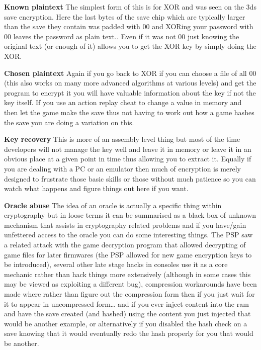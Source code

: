 \documentclass[
]{book}
\begin{document}
\textbf{Known plaintext} The simplest form of this is for XOR and was seen on the 3ds save encryption. Here the last bytes of the save chip which are typically larger than the save they contain was padded with 00 and XORing your password with 00 leaves the password as plain text.. Even if it was not 00 just knowing the original text (or enough of it) allows you to get the XOR key by simply doing the XOR.

\textbf{Chosen plaintext} Again if you go back to XOR if you can choose a file of all 00 (this also works on many more advanced algorithms at various levels) and get the program to encrypt it you will have valuable information about the key if not the key itself. If you use an action replay cheat to change a value in memory and then let the game make the save thus not having to work out how a game hashes the save you are doing a variation on this.

\textbf{Key recovery} This is more of an assembly level thing but most of the time developers will not manage the key well and leave it in memory or leave it in an obvious place at a given point in time thus allowing you to extract it. Equally if you are dealing with a PC or an emulator then much of encryption is merely designed to frustrate those basic skills or those without much patience so you can watch what happens and figure things out here if you want.

\textbf{Oracle abuse} The idea of an oracle is actually a specific thing within cryptography but in loose terms it can be summarised as a black box of unknown mechanism that assists in cryptography related problems and if you have/gain unfettered access to the oracle you can do some interesting things. The PSP saw a related attack with the game decryption program that allowed decrypting of game files for later firmwares (the PSP allowed for new game encryption keys to be introduced), several other late stage hacks in consoles use it as a core mechanic rather than hack things more extensively (although in some cases this may be viewed as exploiting a different bug), compression workarounds have been made where rather than figure out the compression form then if you just wait for it to appear in uncompressed form\ldots{} and if you ever inject content into the ram and have the save created (and hashed) using the content you just injected that would be another example, or alternatively if you disabled the hash check on a save knowing that it would eventually redo the hash properly for you that would be another.
\end{document}
